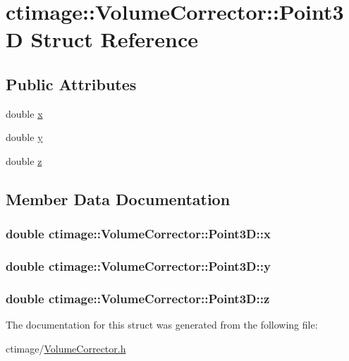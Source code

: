 \hypertarget{structctimage_1_1_volume_corrector_1_1_point3_d}{
\section{ctimage::VolumeCorrector::Point3D Struct Reference}
\label{structctimage_1_1_volume_corrector_1_1_point3_d}
}
\subsection*{Public Attributes}
\begin{DoxyCompactItemize}
\item 
double \hyperlink{structctimage_1_1_volume_corrector_1_1_point3_d_a739237e819b2ba0e997cb4836d201d23}{x}
\item 
double \hyperlink{structctimage_1_1_volume_corrector_1_1_point3_d_abdee8619a4fb03c3165758abb82b0757}{y}
\item 
double \hyperlink{structctimage_1_1_volume_corrector_1_1_point3_d_a302868e9d558e7fb69d38c49fc189c65}{z}
\end{DoxyCompactItemize}


\subsection{Member Data Documentation}
\hypertarget{structctimage_1_1_volume_corrector_1_1_point3_d_a739237e819b2ba0e997cb4836d201d23}{
\subsubsection[{x}]{\setlength{\rightskip}{0pt plus 5cm}double {\bf ctimage::VolumeCorrector::Point3D::x}}}
\label{structctimage_1_1_volume_corrector_1_1_point3_d_a739237e819b2ba0e997cb4836d201d23}
\hypertarget{structctimage_1_1_volume_corrector_1_1_point3_d_abdee8619a4fb03c3165758abb82b0757}{
\subsubsection[{y}]{\setlength{\rightskip}{0pt plus 5cm}double {\bf ctimage::VolumeCorrector::Point3D::y}}}
\label{structctimage_1_1_volume_corrector_1_1_point3_d_abdee8619a4fb03c3165758abb82b0757}
\hypertarget{structctimage_1_1_volume_corrector_1_1_point3_d_a302868e9d558e7fb69d38c49fc189c65}{
\subsubsection[{z}]{\setlength{\rightskip}{0pt plus 5cm}double {\bf ctimage::VolumeCorrector::Point3D::z}}}
\label{structctimage_1_1_volume_corrector_1_1_point3_d_a302868e9d558e7fb69d38c49fc189c65}


The documentation for this struct was generated from the following file:\begin{DoxyCompactItemize}
\item 
ctimage/\hyperlink{_volume_corrector_8h}{VolumeCorrector.h}\end{DoxyCompactItemize}
